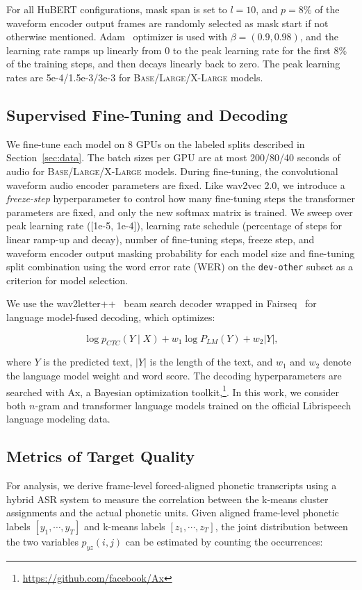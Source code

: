 For all HuBERT configurations, mask span is set to $l=10$, and $p=8\%$ of the waveform encoder output frames are randomly selected as mask start if not otherwise mentioned. Adam~\cite{kingma2014adam} optimizer is used with $\beta = (0.9, 0.98)$, and the learning rate ramps up linearly from 0 to the peak learning rate for the first 8\% of the training steps, and then decays linearly back to zero. The peak learning rates are 5e-4/1.5e-3/3e-3 for \textsc{Base}/\textsc{Large}/\textsc{X-Large} models.

\subsection{Supervised Fine-Tuning and Decoding} We fine-tune each model on 8 GPUs on the labeled splits described in Section~\ref{sec:data}. The batch sizes per GPU are at most 200/80/40 seconds of audio for \textsc{Base}/\textsc{Large}/\textsc{X-Large} models. During fine-tuning, the convolutional waveform audio encoder parameters are fixed. Like wav2vec 2.0, we introduce a \textit{freeze-step} hyperparameter to control how many fine-tuning steps the transformer parameters are fixed, and only the new softmax matrix is trained. We sweep over peak learning rate ([1e-5, 1e-4]), learning rate schedule (percentage of steps for linear ramp-up and decay), number of fine-tuning steps, freeze step, and waveform encoder output masking probability for each model size and fine-tuning split combination using the word error rate (WER) on the \texttt{dev-other} subset as a criterion for model selection.

We use the wav2letter++~\cite{pratap2018wav2letter++} beam search decoder wrapped in Fairseq~\cite{ott2019fairseq} for language model-fused decoding, which optimizes:

\begin{equation}
    \log p_{CTC}(Y \mid X) + w_1 \log P_{LM}(Y) + w_2 |Y|,
\end{equation}

where $Y$ is the predicted text, $|Y|$ is the length of the text, and $w_1$ and $w_2$ denote the language model weight and word score. The decoding hyperparameters are searched with Ax, a Bayesian optimization toolkit,\footnote{\url{https://github.com/facebook/Ax}}. In this work, we consider both $n$-gram and transformer language models trained on the official Librispeech language modeling data.

\subsection{Metrics of Target Quality} For analysis, we derive frame-level forced-aligned phonetic transcripts using a hybrid ASR system to measure the correlation between the k-means cluster assignments and the actual phonetic units. Given aligned frame-level phonetic labels $[y_1, \cdots, y_T]$ and k-means labels $[z_1, \cdots, z_T]$, the joint distribution between the two variables $p_{yz}(i, j)$ can be estimated by counting the occurrences:


